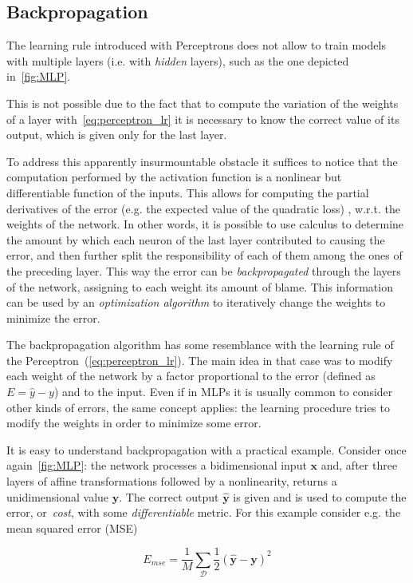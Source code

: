 \subsection{Backpropagation}\label{sec:backprop}
The learning rule introduced with Perceptrons does not allow to train models
with multiple layers (i.e. with \emph{hidden} layers), such as the one depicted
in~\autoref{fig:MLP}.

This is not possible due to the fact that to compute the variation of the
weights of a layer with~\autoref{eq:perceptron_lr} it is necessary to know the
correct value of its output, which is given only for the last layer.

To address this apparently insurmountable obstacle it suffices to notice that
the computation performed by the activation function is a nonlinear but
differentiable function of the inputs. This allows for computing the partial
derivatives of the error (e.g. the expected value of the quadratic loss) ,
w.r.t. the weights of the network. In other words, it is possible to use
calculus to determine the amount by which each neuron of the last layer
contributed to causing the error, and then further split the responsibility of
each of them among the ones of the preceding layer. This way the error can be
\emph{backpropagated} through the layers of the network, assigning to each
weight its amount of blame. This information can be used by an
\emph{optimization algorithm} to iteratively change the weights to minimize the
error.

The backpropagation algorithm has some resemblance with the learning rule of
the Perceptron~(\autoref{eq:perceptron_lr}). The main idea in that case was
to modify each weight of the network by a factor proportional to the error
(defined as $E = \hat y - y$) and to the input. Even if in MLPs it is usually
common to consider other kinds of errors, the same concept applies: the
learning procedure tries to modify the weights in order to minimize some error.

It is easy to understand backpropagation with a practical example. Consider
once again~\autoref{fig:MLP}: the network processes a bidimensional input
$\mathbf{x}$ and, after three layers of affine transformations followed by a
nonlinearity, returns a unidimensional value $\mathbf{y}$. The correct output
$\mathbf{\hat y}$ is given and is used to compute the error, or~\emph{cost},
with some \emph{differentiable} metric. For this example consider e.g. the mean
squared error (MSE)

\begin{equation}\label{eq:MSE}
    E_{mse} = \frac{1}{M} \sum_{\mathcal{D}}\frac{1}{2}(\mathbf{\hat y} - \mathbf{y})^2
\end{equation}

